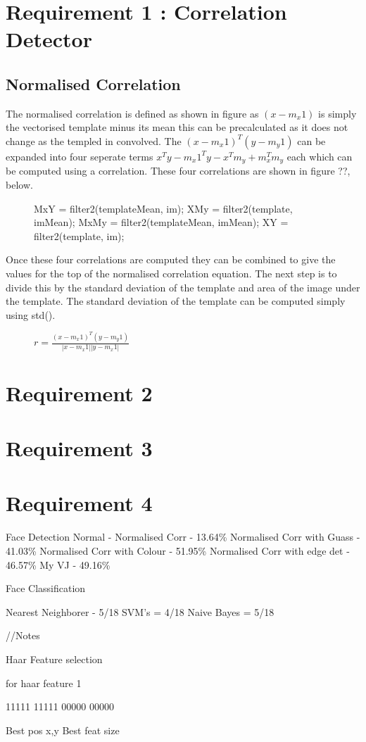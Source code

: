 

\section{Requirement 1 : Correlation Detector}

\subsection{Normalised Correlation}

The normalised correlation is defined as shown in figure as $(x-m_x1)$ is simply
the vectorised template minus its mean this can be precalculated as it does not
change as the templed in convolved. The $(x-m_x1)^T(y-m_y1)$ can be expanded into
four seperate terms $x^Ty - m_x1^Ty - x^Tm_y + m_x^Tm_y$ each which can be computed
using a correlation. These four correlations are shown in figure ??, below.

\begin{figure}
MxY = filter2(templateMean, im);
XMy = filter2(template, imMean);
MxMy = filter2(templateMean, imMean);
XY = filter2(template, im);
\end{figure}

Once these four correlations are computed they can be combined to give the values
for the top of the normalised correlation equation. The next step is to divide
this by the standard deviation of the template and area of the image under the
template. The standard deviation of the template can be computed simply using
std().


\begin{figure}
$r=\frac{(x-m_x1)^T(y-m_y1)}{|x-m_x1||y-m_x1|}$
\end{figure}

\section{Requirement 2}

\section{Requirement 3}

\section{Requirement 4}

Face Detection
Normal -
Normalised Corr - 13.64\%
Normalised Corr with Guass - 41.03\%
Normalised Corr with Colour - 51.95\%
Normalised Corr with edge det - 46.57\%
My VJ - 49.16\%

Face Classification

Nearest Neighborer - 5/18
SVM's = 4/18
Naive Bayes = 5/18




//Notes

Haar Feature selection

for haar feature 1

11111
11111
00000
00000

Best pos x,y
Best feat size
